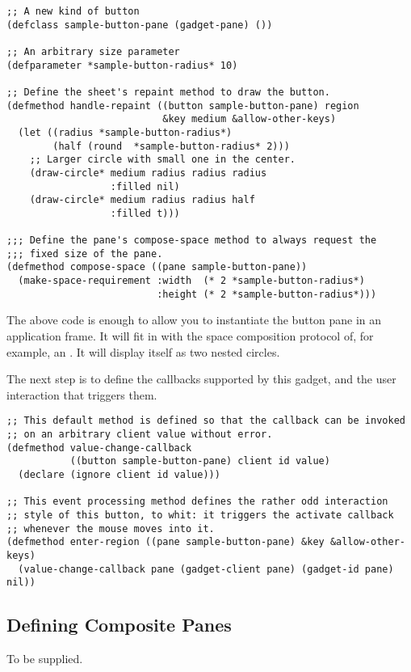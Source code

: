 \begin{verbatim}
;; A new kind of button
(defclass sample-button-pane (gadget-pane) ())

;; An arbitrary size parameter
(defparameter *sample-button-radius* 10)

;; Define the sheet's repaint method to draw the button.
(defmethod handle-repaint ((button sample-button-pane) region 
                           &key medium &allow-other-keys)
  (let ((radius *sample-button-radius*)
        (half (round  *sample-button-radius* 2)))
    ;; Larger circle with small one in the center.
    (draw-circle* medium radius radius radius
                  :filled nil)
    (draw-circle* medium radius radius half
                  :filled t)))

;;; Define the pane's compose-space method to always request the
;;; fixed size of the pane.
(defmethod compose-space ((pane sample-button-pane))
  (make-space-requirement :width  (* 2 *sample-button-radius*)
                          :height (* 2 *sample-button-radius*)))
\end{verbatim}

The above code is enough to allow you to instantiate the button pane in an
application frame.  It will fit in with the space composition protocol of, for
example, an .  It will display itself as two nested circles.

The next step is to define the callbacks supported by this gadget, and the user
interaction that triggers them.

\begin{verbatim}
;; This default method is defined so that the callback can be invoked
;; on an arbitrary client value without error.
(defmethod value-change-callback
           ((button sample-button-pane) client id value)
  (declare (ignore client id value)))

;; This event processing method defines the rather odd interaction
;; style of this button, to whit: it triggers the activate callback
;; whenever the mouse moves into it.
(defmethod enter-region ((pane sample-button-pane) &key &allow-other-keys)
  (value-change-callback pane (gadget-client pane) (gadget-id pane) nil))
\end{verbatim}


\subsection {Defining Composite Panes} 

 {To be supplied.}


